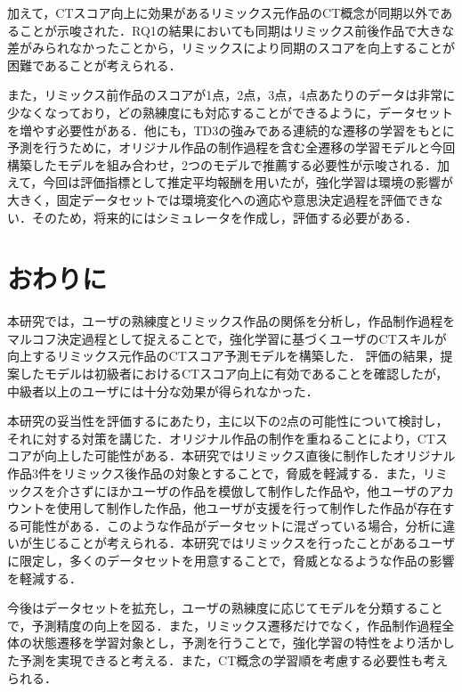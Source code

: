 \documentclass[submit,techrep,noauthor]{ipsj}
\begin{document}
加えて，CTスコア向上に効果があるリミックス元作品のCT概念が同期以外であることが示唆された．RQ1の結果においても同期はリミックス前後作品で大きな差がみられなかったことから，リミックスにより同期のスコアを向上することが困難であることが考えられる．

また，リミックス前作品のスコアが1点，2点，3点，4点あたりのデータは非常に少なくなっており，どの熟練度にも対応することができるように，データセットを増やす必要性がある．他にも，TD3の強みである連続的な遷移の学習をもとに予測を行うために，オリジナル作品の制作過程を含む全遷移の学習モデルと今回構築したモデルを組み合わせ，2つのモデルで推薦する必要性が示唆される．加えて，今回は評価指標として推定平均報酬を用いたが，強化学習は環境の影響が大きく，固定データセットでは環境変化への適応や意思決定過程を評価できない．そのため，将来的にはシミュレータを作成し，評価する必要がある．


\section{おわりに}
\label{sec:conclusion}
本研究では，ユーザの熟練度とリミックス作品の関係を分析し，作品制作過程をマルコフ決定過程として捉えることで，強化学習に基づくユーザのCTスキルが向上するリミックス元作品のCTスコア予測モデルを構築した．
評価の結果，提案したモデルは初級者におけるCTスコア向上に有効であることを確認したが，中級者以上のユーザには十分な効果が得られなかった．

本研究の妥当性を評価するにあたり，主に以下の2点の可能性について検討し，それに対する対策を講じた．オリジナル作品の制作を重ねることにより，CTスコアが向上した可能性がある．本研究ではリミックス直後に制作したオリジナル作品3件をリミックス後作品の対象とすることで，脅威を軽減する．また，リミックスを介さずにほかユーザの作品を模倣して制作した作品や，他ユーザのアカウントを使用して制作した作品，他ユーザが支援を行って制作した作品が存在する可能性がある．このような作品がデータセットに混ざっている場合，分析に違いが生じることが考えられる．本研究ではリミックスを行ったことがあるユーザに限定し，多くのデータセットを用意することで，脅威となるような作品の影響を軽減する．

今後はデータセットを拡充し，ユーザの熟練度に応じてモデルを分類することで，予測精度の向上を図る．また，リミックス遷移だけでなく，作品制作過程全体の状態遷移を学習対象とし，予測を行うことで，強化学習の特性をより活かした予測を実現できると考える．また，CT概念の学習順を考慮する必要性も考えられる．





\end{document}
